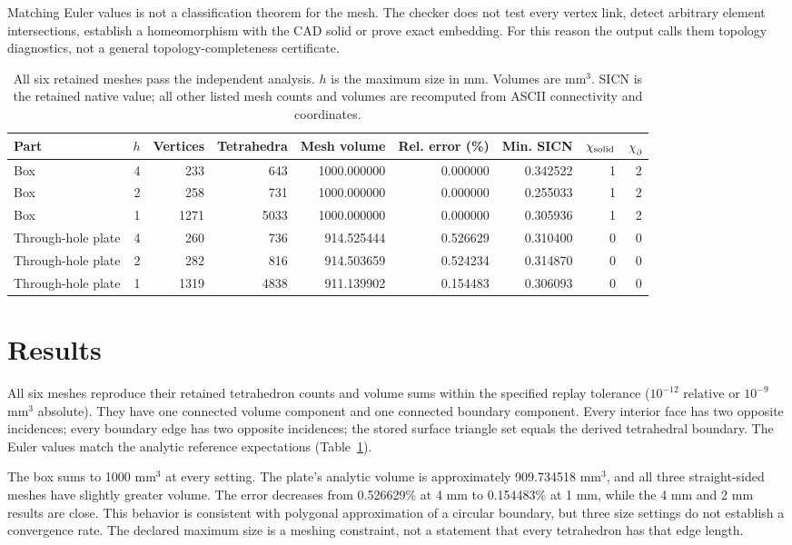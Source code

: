 \documentclass[twoside,leqno,twocolumn]{article}
\begin{document}
Matching Euler values is not a classification theorem for the mesh. The checker does not test every vertex link, detect arbitrary element intersections, establish a homeomorphism with the CAD solid or prove exact embedding. For this reason the output calls them topology diagnostics, not a general topology-completeness certificate.

\begin{table}[t]
\centering
\caption{All six retained meshes pass the independent analysis. $h$ is the maximum size in mm. Volumes are mm$^3$. SICN is the retained native value; all other listed mesh counts and volumes are recomputed from ASCII connectivity and coordinates.}
\label{tab:results}
\begin{tabular}{lrrrrrrrr}
\toprule
Part & $h$ & Vertices & Tetrahedra & Mesh volume & Rel. error (\%) & Min. SICN & $\chi_{\rm solid}$ & $\chi_{\partial}$\\
\midrule
Box & 4 & 233 & 643 & 1000.000000 & 0.000000 & 0.342522 & 1 & 2\\
Box & 2 & 258 & 731 & 1000.000000 & 0.000000 & 0.255033 & 1 & 2\\
Box & 1 & 1271 & 5033 & 1000.000000 & 0.000000 & 0.305936 & 1 & 2\\
Through-hole plate & 4 & 260 & 736 & 914.525444 & 0.526629 & 0.310400 & 0 & 0\\
Through-hole plate & 2 & 282 & 816 & 914.503659 & 0.524234 & 0.314870 & 0 & 0\\
Through-hole plate & 1 & 1319 & 4838 & 911.139902 & 0.154483 & 0.306093 & 0 & 0\\
\bottomrule
\end{tabular}
\end{table}

\section{Results}
All six meshes reproduce their retained tetrahedron counts and volume sums within the specified replay tolerance ($10^{-12}$ relative or $10^{-9}$ mm$^3$ absolute). They have one connected volume component and one connected boundary component. Every interior face has two opposite incidences; every boundary edge has two opposite incidences; the stored surface triangle set equals the derived tetrahedral boundary. The Euler values match the analytic reference expectations (Table~\ref{tab:results}).

The box sums to 1000 mm$^3$ at every setting. The plate's analytic volume is approximately 909.734518 mm$^3$, and all three straight-sided meshes have slightly greater volume. The error decreases from 0.526629\% at 4 mm to 0.154483\% at 1 mm, while the 4 mm and 2 mm results are close. This behavior is consistent with polygonal approximation of a circular boundary, but three size settings do not establish a convergence rate. The declared maximum size is a meshing constraint, not a statement that every tetrahedron has that edge length.
\end{document}
